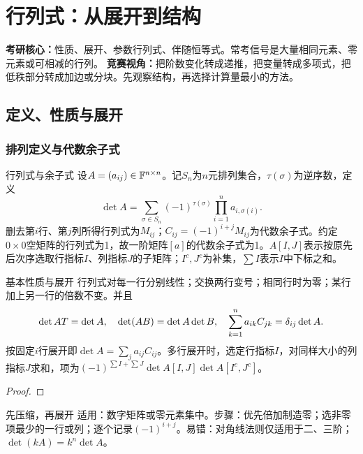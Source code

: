 \chapter{行列式：从展开到结构}\label{ch:det}
\begin{examtip}
\textbf{考研核心：}性质、展开、参数行列式、伴随恒等式。常考信号是大量相同元素、零元素或可相减的行列。
\textbf{竞赛视角：}把阶数变化转成递推，把变量转成多项式，把低秩部分转成加边或分块。先观察结构，再选择计算量最小的方法。
\end{examtip}
\section{定义、性质与展开}
\subsection{排列定义与代数余子式}
\begin{definition}{行列式与余子式}
设$A=(a_{ij})\in\mathbb{F}^{n\times n}$。记$S_n$为$n$元排列集合，$\tau(\sigma)$为逆序数，定义
\begin{equation}\det A=\sum_{\sigma\in S_n}(-1)^{\tau(\sigma)}\prod_{i=1}^n a_{i,\sigma(i)}.\end{equation}
删去第$i$行、第$j$列所得行列式为$M_{ij}$；$C_{ij}=(-1)^{i+j}M_{ij}$为代数余子式。约定$0\times0$空矩阵的行列式为1，故一阶矩阵$[a]$的代数余子式为1。$A[I,J]$表示按原先后次序选取行指标$I$、列指标$J$的子矩阵；$I^c,J^c$为补集，$\sum I$表示$I$中下标之和。
\end{definition}
\begin{theorem}{基本性质与展开}
行列式对每一行分别线性；交换两行变号；相同行时为零；某行加上另一行的倍数不变。并且
\begin{equation}\det AT=\det A,\quad\det(AB)=\det A\det B,\quad
\sum_{k=1}^n a_{ik}C_{jk}=\delta_{ij}\det A.\label{eq:cofactor}\end{equation}
按固定$i$行展开即$\det A=\sum_j a_{ij}C_{ij}$。多行展开时，选定行指标$I$，对同样大小的列指标$J$求和，项为$(-1)^{\sum I+\sum J}\det A[I,J]\det A[I^c,J^c]$。
\end{theorem}
\begin{proof}

\end{proof}
\begin{method}{先压缩，再展开}
适用：数字矩阵或零元素集中。步骤：优先倍加制造零；选非零项最少的一行或列；逐个记录$(-1)^{i+j}$。易错：对角线法则仅适用于二、三阶；$\det(kA)=k^n\det A$。
\end{method}
